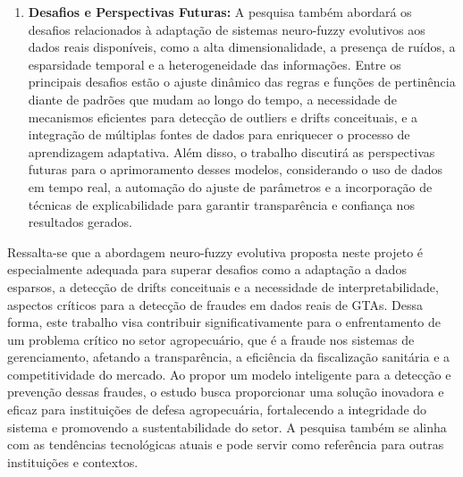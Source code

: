 \begin{enumerate}
\item \textbf{Desafios e Perspectivas Futuras:} A pesquisa também abordará os desafios relacionados à adaptação de sistemas neuro-fuzzy evolutivos aos dados reais disponíveis, como a alta dimensionalidade, a presença de ruídos, a esparsidade temporal e a heterogeneidade das informações. Entre os principais desafios estão o ajuste dinâmico das regras e funções de pertinência diante de padrões que mudam ao longo do tempo, a necessidade de mecanismos eficientes para detecção de outliers e drifts conceituais, e a integração de múltiplas fontes de dados para enriquecer o processo de aprendizagem adaptativa. Além disso, o trabalho discutirá as perspectivas futuras para o aprimoramento desses modelos, considerando o uso de dados em tempo real, a automação do ajuste de parâmetros e a incorporação de técnicas de explicabilidade para garantir transparência e confiança nos resultados gerados.
\end{enumerate}


Ressalta-se que a abordagem neuro-fuzzy evolutiva proposta neste projeto é especialmente adequada para superar desafios como a adaptação a dados esparsos, a detecção de drifts conceituais e a necessidade de interpretabilidade, aspectos críticos para a detecção de fraudes em dados reais de GTAs. Dessa forma, este trabalho visa contribuir significativamente para o enfrentamento de um problema crítico no setor agropecuário, que é a fraude nos sistemas de gerenciamento, afetando a transparência, a eficiência da fiscalização sanitária e a competitividade do mercado. Ao propor um modelo inteligente para a detecção e prevenção dessas fraudes, o estudo busca proporcionar uma solução inovadora e eficaz para instituições de defesa agropecuária, fortalecendo a integridade do sistema e promovendo a sustentabilidade do setor. A pesquisa também se alinha com as tendências tecnológicas atuais e pode servir como referência para outras instituições e contextos.

